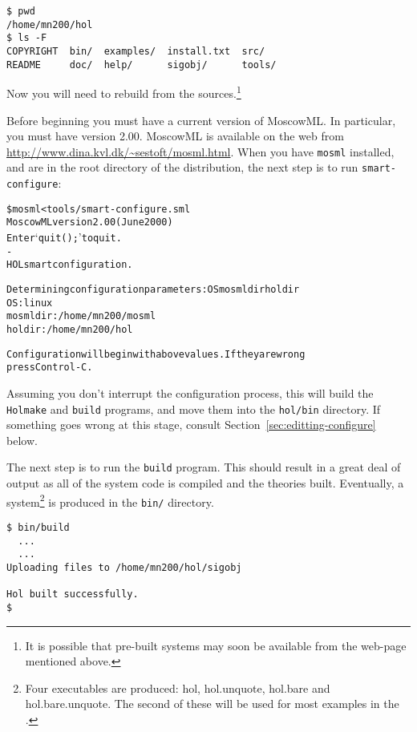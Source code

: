 \setcounter{sessioncount}{0}
\begin{session}
\begin{verbatim}
$ pwd
/home/mn200/hol
$ ls -F
COPYRIGHT  bin/  examples/  install.txt  src/
README     doc/  help/      sigobj/      tools/
\end{verbatim}
\end{session}

Now you will need to rebuild \HOL{} from the sources.\footnote{It is
  possible that pre-built systems may soon be available from the
  web-page mentioned above.}

Before beginning you must have a current version of MoscowML.  In
particular, you must have version 2.00.  MoscowML is available on the
web from \url{http://www.dina.kvl.dk/~sestoft/mosml.html}.
When you have \texttt{mosml} installed, and are in the root directory
of the distribution, the next step is to run \texttt{smart-configure}:

\begin{session}
\begin{alltt}
\$ mosml < tools/smart-configure.sml
Moscow ML version 2.00 (June 2000)
Enter `quit();' to quit.
-
HOL smart configuration.

Determining configuration parameters: OS mosmldir holdir
OS:       linux
mosmldir: /home/mn200/mosml
holdir:   /home/mn200/hol

Configuration will begin with above values.  If they are wrong
press Control-C.
\end{alltt}
\end{session}

Assuming you don't interrupt the configuration process, this will
build the \texttt{Holmake} and \texttt{build} programs, and move them
into the \texttt{hol/bin} directory.  If something goes wrong at this
stage, consult Section~\ref{sec:editting-configure} below.

The next step is to run the \texttt{build} program.  This should
result in a great deal of output as all of the system code is compiled
and the theories built.  Eventually, a \HOL{} system\footnote{Four
  \HOL{} executables are produced: \textsf{hol}, \textsf{hol.unquote},
  \textsf{hol.bare} and \textsf{hol.bare.unquote}.  The second of
  these will be used for most examples in the \TUTORIAL{}.} is
produced in the \texttt{bin/} directory.

\begin{session}
\begin{verbatim}
$ bin/build
  ...
  ...
Uploading files to /home/mn200/hol/sigobj

Hol built successfully.
$
\end{verbatim}
\end{session}


